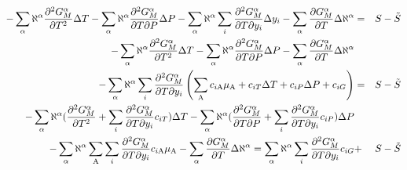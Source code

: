 \documentclass[12pt]{article}
\begin{document}
\begin{eqnarray}
-\sum_{\alpha} \aleph^{\alpha} 
\frac{\partial^2 G^{\alpha}_M}{\partial T^2} \Delta T
-\sum_{\alpha} \aleph^{\alpha} 
\frac{\partial^2 G^{\alpha}_M}{\partial T\partial P} \Delta P 
-\sum_{\alpha} \aleph^{\alpha} 
\sum_i\frac{\partial^2 G^{\alpha}_M}{\partial T\partial y_{i}} \Delta y_i -
\sum_{\alpha} \frac{\partial G^{\alpha}_M}{\partial T} \Delta\aleph^{\alpha}
&=& S - \tilde S\nonumber\\
-\sum_{\alpha} \aleph^{\alpha} 
\frac{\partial^2 G^{\alpha}_M}{\partial T^2} \Delta T
-\sum_{\alpha} \aleph^{\alpha} 
\frac{\partial^2 G^{\alpha}_M}{\partial T\partial P} \Delta P
-\sum_{\alpha} \frac{\partial G^{\alpha}_M}{\partial T} \Delta\aleph^{\alpha} \nonumber\\
-\sum_{\alpha} \aleph^{\alpha} 
\sum_i\frac{\partial^2 G^{\alpha}_M}{\partial T\partial y_{i}} 
\left(\sum_{\rm A}c_{i\rm A}\mu_{\rm A}+c_{iT}\Delta T+c_{iP}\Delta P+c_{iG}\right)
&=& S - \tilde S\nonumber\\
-\sum_{\alpha} \aleph^{\alpha} 
(\frac{\partial^2 G^{\alpha}_M}{\partial T^2}+
\sum_i\frac{\partial^2 G^{\alpha}_M}{\partial T\partial y_{i}} c_{iT})\Delta T
-\sum_{\alpha} \aleph^{\alpha} 
(\frac{\partial^2 G^{\alpha}_M}{\partial T\partial P}+
\sum_i\frac{\partial^2 G^{\alpha}_M}{\partial T\partial y_{i}} c_{iP})\Delta P \nonumber\\
-\sum_{\alpha} \aleph^{\alpha}
\sum_{\rm A}\sum_i\frac{\partial^2 G^{\alpha}_M}{\partial T\partial y_{i}} c_{i\rm A}\mu_{\rm A}
-\sum_{\alpha} \frac{\partial G^{\alpha}_M}{\partial T} \Delta\aleph^{\alpha}
= \sum_{\alpha} \aleph^{\alpha}
\sum_i\frac{\partial^2 G^{\alpha}_M}{\partial T\partial y_{i}} c_{iG}
&+&S - \tilde S\nonumber\\
\end{eqnarray}
\end{document}
